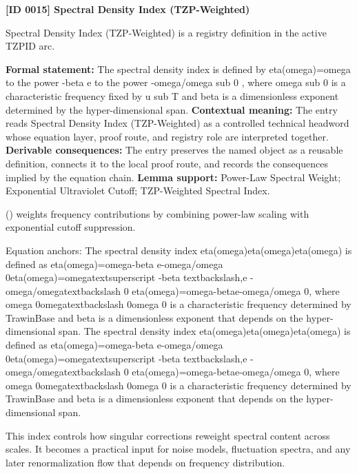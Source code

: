 \clearpage
\noindent\textbf{[ID 0015] Spectral Density Index (TZP-Weighted)}\par
\vspace{0.35em}
\begingroup\small
{}
Spectral Density Index (TZP-Weighted) is a registry definition in the active TZPID arc.

\begingroup\footnotesize\setlength{\emergencystretch}{3em}\sloppy
\textbf{Formal statement:} The spectral density index is defined by eta(omega)=omega to the power -beta e to the power -omega/omega sub 0 , where omega sub 0 is a characteristic frequency fixed by u sub T and beta is a dimensionless exponent determined by the hyper-dimensional span. \textbf{Contextual meaning:} The entry reads Spectral Density Index (TZP-Weighted) as a controlled technical headword whose equation layer, proof route, and registry role are interpreted together. \textbf{Derivable consequences:} The entry preserves the named object as a reusable definition, connects it to the local proof route, and records the consequences implied by the equation chain. \textbf{Lemma support:} Power-Law Spectral Weight; Exponential Ultraviolet Cutoff; TZP-Weighted Spectral Index.\par
\endgroup

() weights frequency contributions by combining power-law scaling with exponential cutoff suppression.

Equation anchors: The spectral density index eta(omega)eta(omega)eta(omega) is defined as eta(omega)=omega-beta e-omega/omega 0eta(omega)=omegatextsuperscript -beta textbackslash,e -omega/omegatextbackslash 0 eta(omega)=omega-betae-omega/omega 0, where omega 0omegatextbackslash 0omega 0 is a characteristic frequency determined by TrawinBase and beta is a dimensionless exponent that depends on the hyper-dimensional span. The spectral density index eta(omega)eta(omega)eta(omega) is defined as eta(omega)=omega-beta e-omega/omega 0eta(omega)=omegatextsuperscript -beta textbackslash,e -omega/omegatextbackslash 0 eta(omega)=omega-betae-omega/omega 0, where omega 0omegatextbackslash 0omega 0 is a characteristic frequency determined by TrawinBase and beta is a dimensionless exponent that depends on the hyper-dimensional span.

This index controls how singular corrections reweight spectral content across scales. It becomes a practical input for noise models, fluctuation spectra, and any later renormalization flow that depends on frequency distribution.
\endgroup

